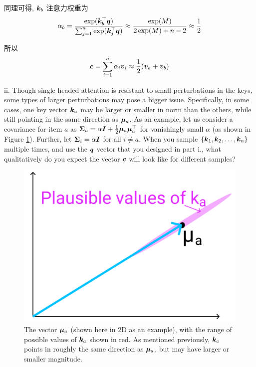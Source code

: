 \documentclass{article}
\begin{document}
同理可得, $\bm{k}_b$ 注意力权重为
\begin{equation}
  \alpha_b
  =\frac{\exp(\bm{k}_{b}^{\top}\bm{q})}{\sum_{j=1}^{n}\exp(\bm{k}_{j}^{\top}\bm{q})}
  \approx\frac{\exp(M)}{2\exp(M)+n-2}
  \approx\frac{1}{2}
\end{equation}

所以
\begin{equation}
  \bm{c}
  =\sum_{i=1}^{n}\alpha_{i}\bm{v}_{i}
  \approx\frac{1}{2}(\bm{v}_{a}+\bm{v}_{b})
\end{equation}

\quad ii. Though single-headed attention is resistant to small perturbations in the keys, some types of larger perturbations may pose a bigger issue. Specifically, in some cases, one key vector $\bm{k}_a$ may be larger or smaller in norm than the others, while still pointing in the same direction as $\bm{\mu}_a$. As an example, let us consider a covariance for item $a$ as $\bm{\Sigma}_{a}=\alpha \bm{I}+\frac{1}{2}\bm{\mu}_{a} \bm{\mu}_{a}^{\top}$ for vanishingly small $\alpha$ (as shown in Figure \ref{fig:1}). Further, let $\bm{\Sigma}_{i}=\alpha\bm{I}$ for all $i \neq a$. When you sample $\{\bm{k}_{1},\bm{k}_2,\dots, \bm{k}_{n}\}$ multiple times, and use the $\bm{q}$ vector that you designed in part i., what qualitatively do you expect the vector $\bm{c}$ will look like for different samples?
\begin{figure}[t]
  \centering
  \includegraphics[scale=0.5]{figure1.png}
  \caption{The vector $\bm{\mu}_a$ (shown here in 2D as an example), with the range of possible values of $\bm{k}_a$ shown in red. As mentioned previously, $\bm{k}_a$ points in roughly the same direction as $\bm{\mu}_a$, but may have larger or smaller magnitude.}
  \label{fig:1}
\end{figure}
\end{document}
